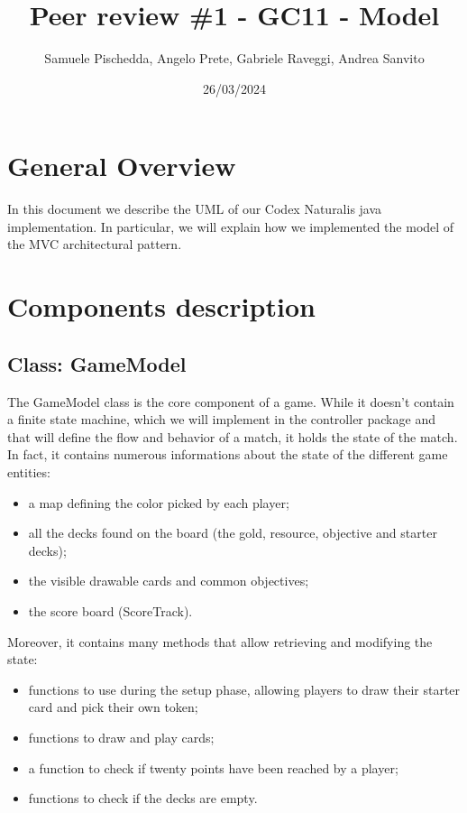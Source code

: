 \documentclass{article}
\title{Peer review \#1 - GC11 - Model}
\author{Samuele Pischedda, Angelo Prete, Gabriele Raveggi, Andrea Sanvito }
\date{26/03/2024}
\begin{document}
\begin{titlepage}
\maketitle
\end{titlepage}

\section*{General Overview}
In this document we describe the UML of our Codex Naturalis java implementation. \newline
In particular, we will explain how we implemented the model of the MVC architectural pattern.

\section*{Components description}

\setcounter{section}{1}
\subsection[1]{Class: GameModel}
The GameModel class is the core component of a game.
While it doesn't contain a finite state machine, which we will implement in the controller package and that will define the flow and behavior of a match, it holds the state of the match.
In fact, it contains numerous informations about the state of the different game entities:
\begin{itemize}
    \item a map defining the color picked by each player;
    \item all the decks found on the board (the gold, resource, objective and starter decks);
    \item the visible drawable cards and common objectives;
    \item the score board (ScoreTrack).
\end{itemize}
Moreover, it contains many methods that allow retrieving and modifying the state:
\begin{itemize}
    \item functions to use during the setup phase, allowing players to draw their starter card and pick their own token;
    \item functions to draw and play cards;
    \item a function to check if twenty points have been reached by a player;
    \item functions to check if the decks are empty.
\end{itemize}
\end{document}
